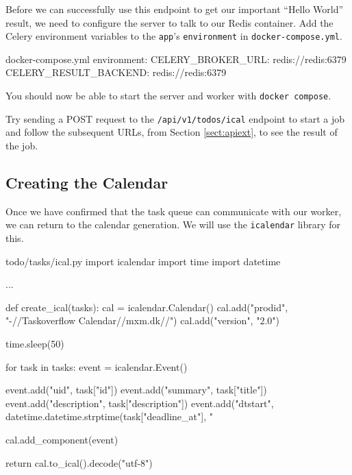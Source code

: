 \documentclass{csse4400}
\begin{document}
Before we can successfully use this endpoint to get our important ``Hello World'' result,
we need to configure the server to talk to our Redis container.
Add the Celery environment variables to the \texttt{app}'s \texttt{environment} in \texttt{docker-compose.yml}.
%
\begin{code}[numbers=none]{docker-compose.yml}
    environment:
      CELERY_BROKER_URL: redis://redis:6379
      CELERY_RESULT_BACKEND: redis://redis:6379
\end{code}

You should now be able to start the server and worker with \texttt{docker compose}.

\vspace{-0.5em}

\vspace{-0.3em}
Try sending a POST request to the \texttt{/api/v1/todos/ical} endpoint
to start a job and follow the subsequent URLs, from Section \ref{sect:apiext}, to see the result of the job.

\subsection{Creating the Calendar}

Once we have confirmed that the task queue can communicate with our worker,
we can return to the calendar generation.
We will use the \texttt{icalendar} library for this.

\vspace{-0.3em}

\vspace{-2.2em}
\begin{code}[language=python,numbers=none]{todo/tasks/ical.py}
import icalendar
import time
import datetime

...

def create_ical(tasks):
    cal = icalendar.Calendar()
    cal.add("prodid", "-//Taskoverflow Calendar//mxm.dk//")
    cal.add("version", "2.0")

    time.sleep(50)

    for task in tasks:
        event = icalendar.Event()
        
        event.add("uid", task["id"])
        event.add("summary", task["title"])
        event.add("description", task["description"])
        event.add("dtstart", datetime.datetime.strptime(task["deadline_at"], "%

        cal.add_component(event)

    return cal.to_ical().decode("utf-8")
\end{code}
\end{document}
